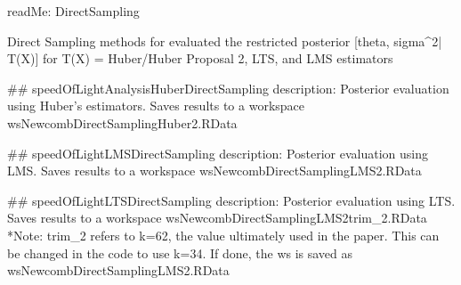 readMe: DirectSampling

Direct Sampling methods for evaluated the restricted posterior [theta, sigma^{2}| T(X)] for T(X) = Huber/Huber Proposal 2, LTS, and LMS estimators

##
speedOfLightAnalysisHuberDirectSampling
description: Posterior evaluation using Huber's estimators. Saves results to a workspace  wsNewcombDirectSamplingHuber2.RData


##
speedOfLightLMSDirectSampling
description: Posterior evaluation using LMS. Saves results to a workspace  wsNewcombDirectSamplingLMS2.RData


##
speedOfLightLTSDirectSampling
description: Posterior evaluation using LTS. Saves results to a workspace  wsNewcombDirectSamplingLMS2trim_2.RData
*Note: trim_2 refers to k=62, the value ultimately used in the paper. This can be changed in the code to use k=34. If done, the ws is saved as wsNewcombDirectSamplingLMS2.RData